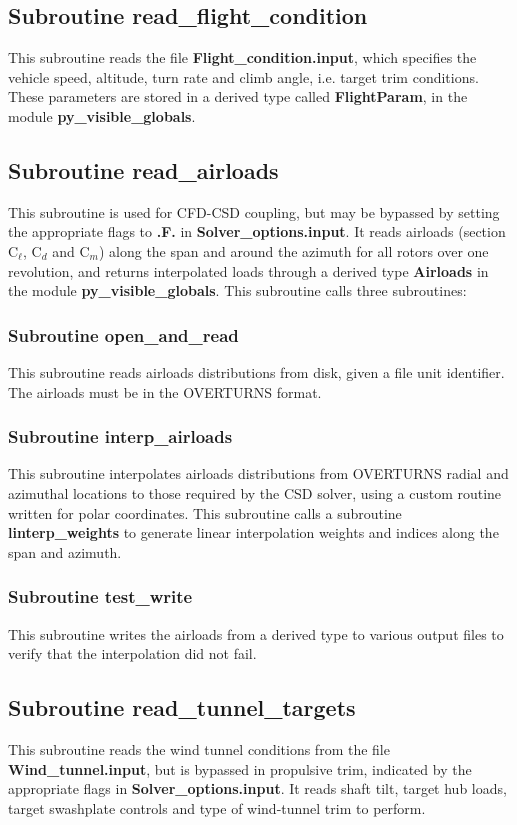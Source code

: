 \subsection{Subroutine read\_flight\_condition}
This subroutine reads the file \textbf{Flight\_condition.input}, which specifies the vehicle speed, altitude, turn rate and climb angle, i.e. target trim conditions. These parameters are stored in a derived type called \textbf{FlightParam}, in the module \textbf{py\_visible\_globals}.

\subsection{Subroutine read\_airloads}
This subroutine is used for CFD-CSD coupling, but may be bypassed by setting the appropriate flags to \textbf{.F.} in \textbf{Solver\_options.input}. It reads airloads (section C$_\ell$, C$_d$ and C$_m$) along the span and around the azimuth for all rotors over one revolution, and returns interpolated loads through a derived type \textbf{Airloads} in the module \textbf{py\_visible\_globals}. This subroutine calls three subroutines:

\subsubsection{Subroutine open\_and\_read}
This subroutine reads airloads distributions from disk, given a file unit identifier. The airloads must be in the OVERTURNS format. 

\subsubsection{Subroutine interp\_airloads}
This subroutine interpolates airloads distributions from OVERTURNS radial and azimuthal locations to those required by the CSD solver, using a custom routine written for polar coordinates. This subroutine calls a subroutine \textbf{linterp\_weights} to generate linear interpolation weights and indices along the span and azimuth. 

\subsubsection{Subroutine test\_write}
This subroutine writes the airloads from a derived type to various output files to verify that the interpolation did not fail.

\subsection{Subroutine read\_tunnel\_targets}
This subroutine reads the wind tunnel conditions from the file \textbf{Wind\_tunnel.input}, but is bypassed in propulsive trim, indicated by the appropriate flags in \textbf{Solver\_options.input}. It reads shaft tilt, target hub loads, target swashplate controls and type of wind-tunnel trim to perform.

